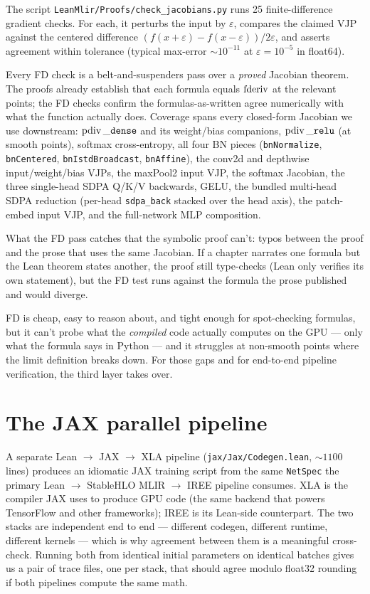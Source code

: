 The script \texttt{LeanMlir/Proofs/check\_jacobians.py} runs 25
finite-difference gradient checks. For each, it perturbs the input by
\(\varepsilon\), compares the claimed VJP against the centered
difference
\((f(x + \varepsilon) - f(x - \varepsilon)) / 2\varepsilon\), and
asserts agreement within tolerance (typical max-error
\(\sim 10^{-11}\) at \(\varepsilon = 10^{-5}\) in float64).

Every FD check is a belt-and-suspenders pass over a
\emph{proved} Jacobian theorem.
The proofs already establish that each formula equals
\(\operatorname{fderiv}\) at the relevant points; the FD checks confirm
the formulas-as-written agree numerically with what the function
actually does. Coverage spans every closed-form Jacobian we use
downstream: \(\operatorname{pdiv}\_\texttt{dense}\) and its weight/bias
companions, \(\operatorname{pdiv}\_\texttt{relu}\) (at smooth points),
softmax cross-entropy, all four BN pieces
(\texttt{bnNormalize}, \texttt{bnCentered},
\texttt{bnIstdBroadcast}, \texttt{bnAffine}), the conv2d and
depthwise input/weight/bias VJPs, the maxPool2 input VJP, the
softmax Jacobian, the three single-head SDPA Q/K/V backwards,
GELU, the bundled multi-head SDPA reduction (per-head
\texttt{sdpa\_back} stacked over the head axis), the patch-embed
input VJP, and the full-network MLP composition.

What the FD pass catches that the symbolic proof can't: typos
between the proof and the prose that uses the same Jacobian.
If a chapter narrates one formula but the Lean theorem states
another, the proof still type-checks (Lean only verifies its
own statement), but the FD test runs against the formula the
prose published and would diverge.

FD is cheap, easy to reason about, and tight enough for
spot-checking formulas, but it can't probe what the
\emph{compiled} code actually computes on the GPU --- only
what the formula says in Python --- and it struggles at
non-smooth points where the limit definition breaks down. For
those gaps and for end-to-end pipeline verification, the third
layer takes over.

\section{The JAX parallel pipeline}

A separate Lean \(\to\) JAX \(\to\) XLA pipeline
(\texttt{jax/Jax/Codegen.lean}, \(\sim 1100\) lines) produces an
idiomatic JAX training script from the same \texttt{NetSpec} the
primary Lean \(\to\) StableHLO MLIR \(\to\) IREE pipeline consumes.
XLA is the compiler JAX uses to produce GPU code (the same backend
that powers TensorFlow and other frameworks); IREE is its Lean-side
counterpart. The two stacks are independent end to end ---
different codegen, different runtime, different kernels --- which
is why agreement between them is a meaningful cross-check. Running
both from identical initial parameters on identical batches gives
us a pair of trace files, one per stack, that should agree modulo
float32 rounding if both pipelines compute the same math.

